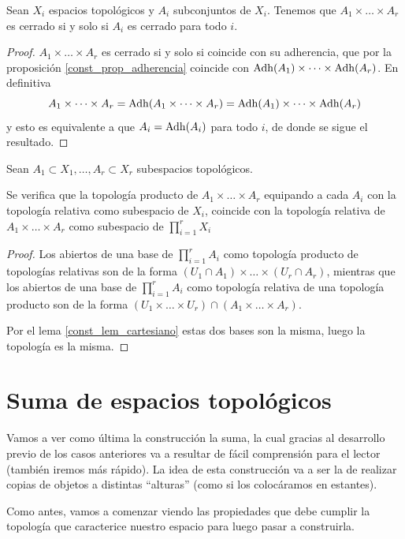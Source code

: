 \begin{cor}[Cerrados]
	Sean $X_i$ espacios topológicos y $A_i$ subconjuntos de $X_i$. Tenemos que
	$A_1 \times \dots \times A_r$ es cerrado si y solo si $A_i$ es cerrado para todo $i$.
\end{cor}
\begin{proof}
	$A_1 \times \dots \times A_r$ es cerrado si y solo si coincide con su adherencia, que por la proposición \ref{const_prop_adherencia} coincide con $\operatorname{\mathrm{Adh}}(A_1) \times \dots \times \operatorname{\mathrm{Adh}}(A_r)$. En definitiva
	\[A_1 \times \dots \times A_r=\operatorname{\mathrm{Adh}}(A_1 \times \dots \times A_r)=\operatorname{\mathrm{Adh}}(A_1) \times \dots \times \operatorname{\mathrm{Adh}}(A_r)\]
	y esto es equivalente a que $A_i=\operatorname{\mathrm{Adh}}(A_i)$ para todo $i$, de donde se sigue el resultado.
\end{proof}	
\begin{prop}[Subespacios]
	Sean $A_1\subset X_1,\dots,A_r\subset X_r$ subespacios topológicos.
	
	Se verifica que la topología producto de $A_1\times\dots\times A_r$ equipando a cada $A_i$ con la topología relativa como subespacio de $X_i$, coincide con la topología relativa de $A_1\times\dots\times A_r$ como subespacio de $\prod_{i=1}^rX_i$
\end{prop}	
\begin{proof}
	Los abiertos de una base de $\prod_{i=1}^rA_i$ como topología producto de topologías relativas son de la forma $(U_1\cap A_1)\times\dots\times(U_r\cap A_r)$, mientras que los abiertos de una base de $\prod_{i=1}^rA_i$ como topología relativa de una topología producto son de la forma $(U_1\times\dots\times U_r)\cap (A_1\times \dots \times A_r)$.
	
	Por el lema \ref{const_lem_cartesiano} estas dos bases son la misma, luego la topología es la misma.
\end{proof}
\section{Suma de espacios topológicos}
Vamos a ver como última la construcción la suma, la cual gracias al desarrollo previo de los casos anteriores va a resultar de fácil comprensión para el lector (también iremos más rápido). La idea de esta construcción va a ser la de realizar copias de objetos a distintas ``alturas'' (como si los colocáramos en estantes). 

Como antes, vamos a comenzar viendo las propiedades que debe cumplir la topología que caracterice nuestro espacio para luego pasar a construirla.

